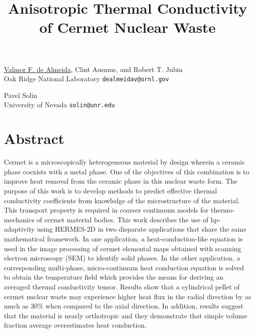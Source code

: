 \title{Anisotropic Thermal Conductivity of Cermet Nuclear Waste}
\author{} \institute{}
\maketitle

\begin{center}
{\large \underline{Valmor F. de Almeida}, Clint Ausmus, and Robert T. Jubin}\\
Oak Ridge National Laboratory {\tt dealmeidav@ornl.gov}\\
\vspace{4mm}

{\large Pavel Solin}\\
University of Nevada {\tt solin@unr.edu}
\end{center}

\section*{Abstract}
Cermet is a microscopically heterogeneous material by design wherein a  ceramic phase coexists with a metal phase. One of the objectives of this combination is to improve heat removal from the  ceramic phase in this nuclear waste form. The purpose of this work is to develop methods to predict effective thermal conductivity coefficients from knowledge of the microstructure of the material. This transport property is required in coarser continuum models for thermo-mechanics of cermet material bodies. This work describes the use of hp-adaptivity using HERMES-2D in two disparate applications that share the same mathematical framework. In one application, a heat-conduction-like equation is used in the image processing of cermet elemental maps obtained with scanning electron microscopy (SEM) to identify solid phases. In the other application, a corresponding multi-phase, micro-continuum heat conduction equation is solved to obtain the temperature field which provides the means for deriving an averaged thermal conductivity tensor. Results show that a cylindrical pellet of cermet nuclear waste  may experience higher heat flux in the radial direction by as much as 30\% when compared to the axial direction. In addition, results suggest that the material is nearly orthotropic and they demonstrate that simple volume fraction average overestimates heat conduction.

